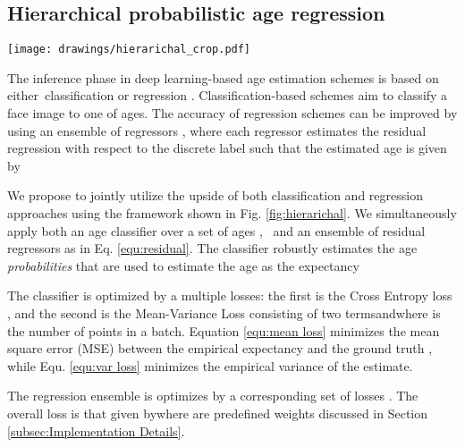\documentclass[10pt,twocolumn,letterpaper]{article}
\begin{document}
\subsection{Hierarchical probabilistic age regression}

\label{subsec:regression}
\begin{figure*}[tb]
\begin{center}
\centering\texttt{[image: drawings/hierarichal\_crop.pdf]}
\end{center}
\caption{The proposed hierarchical regression framework. The input feature
vector  is jointly processed by two parallel branches: the upper is
the classifier, while the lower is the regression ensemble . The age estimate
 is given by the empirical expectancy of }
\label{fig:hierarichal}
\end{figure*}

The inference phase in deep learning-based age estimation schemes is based
on either\ classification \cite{leviage,yi2015age} or regression \cite {8099569, 7780901, 9145576, coral}. Classification-based schemes aim to
classify a face image to one of  ages. The
accuracy of regression schemes can be improved by using an ensemble of
regressors  \cite{8954134, 8578343}, where each regressor  estimates the residual regression with respect
to the discrete label  such that the estimated age  is
given by

We propose to jointly utilize the upside of both classification and
regression approaches using the framework shown in Fig. \ref{fig:hierarichal}. We simultaneously apply both an age classifier over a set of ages , \ and an ensemble of residual regressors  as in Eq. \ref {equ:residual}. The classifier robustly estimates the age \textit{probabilities}  that are used to estimate the age
as the expectancy


The classifier is optimized by a multiple losses: the first is the Cross
Entropy loss , and the second is the Mean-Variance Loss \cite {Mean-Variance} consisting of two termsandwhere  is the number of points in a batch. Equation \ref{equ:mean loss}
minimizes the mean square error (MSE) between the empirical expectancy and
the ground truth , while Equ. \ref{equ:var loss} minimizes the
empirical variance of the estimate.

The regression ensemble  is optimizes by a corresponding set of  losses . The overall loss is that given bywhere  are predefined weights
discussed in Section \ref{subsec:Implementation Details}.
\end{document}
